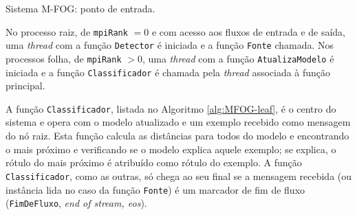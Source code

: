 \begin{algorithm}[htb]
    \KwParams{\mpiRank, \mpiSize}
\caption{Sistema M-FOG: ponto de entrada.}
\label{alg:MFOG}
\end{algorithm}

No processo raiz, de \texttt{mpiRank} $= 0$ e com acesso aos fluxos de entrada e
de saída, uma \emph{thread} com a função \texttt{Detector} é iniciada e a função
\texttt{Fonte} chamada.
Nos processos folha, de \texttt{mpiRank} $> 0$, uma \emph{thread} com a função
\texttt{AtualizaModelo} é iniciada e a função \texttt{Classificador} é chamada pela \emph{thread} associada à função principal.

A função \texttt{Classificador}, listada no Algoritmo \ref{alg:MFOG-leaf}, é o
centro do sistema e opera com o modelo atualizado e um exemplo recebido como
mensagem do nó raiz.
Esta função calcula as distâncias para todos \mclusters do modelo e encontrando
o mais próximo e verificando se o modelo explica aquele exemplo; se explica, o
rótulo do \mcluster mais próximo é atribuído como rótulo do exemplo.
A função \texttt{Classificador}, como as outras, só chega ao seu final se a
mensagem recebida (ou instância lida no caso da função \texttt{Fonte}) é um
marcador de fim de fluxo (\texttt{FimDeFluxo}, \emph{end of stream, eos}).

